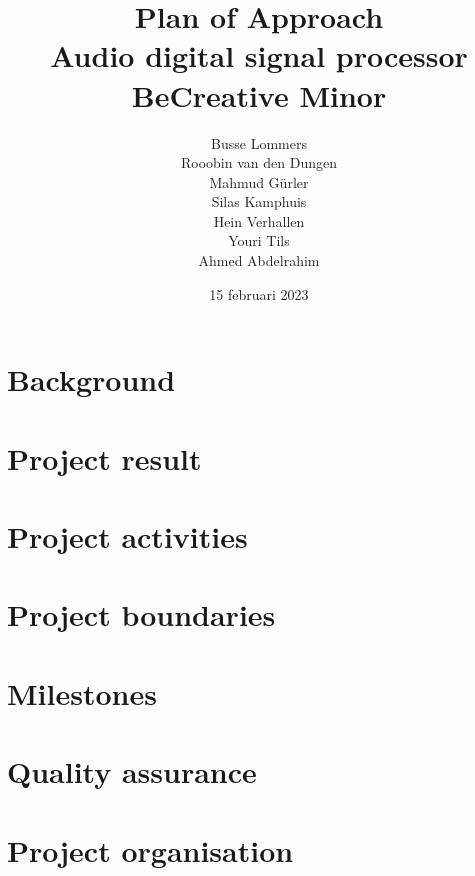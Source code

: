 \documentclass[11pt, a4paper]{report}
\begin{document}
\title{%
  Plan of Approach \\
  \large Audio digital signal processor \\
  BeCreative Minor}
\author{Busse Lommers \\
Rooobin van den Dungen \\
Mahmud Gürler \\
Silas Kamphuis \\
Hein Verhallen \\
Youri Tils \\
Ahmed Abdelrahim}
\date{15 februari 2023}
\maketitle
\tableofcontents

\chapter{Background}
	
	
\chapter{Project result}
	
	
\chapter{Project activities}
	

\chapter{Project boundaries}
	
	
\chapter{Milestones}
	

\chapter{Quality assurance}
	

\chapter{Project organisation}
	
\end{document}
